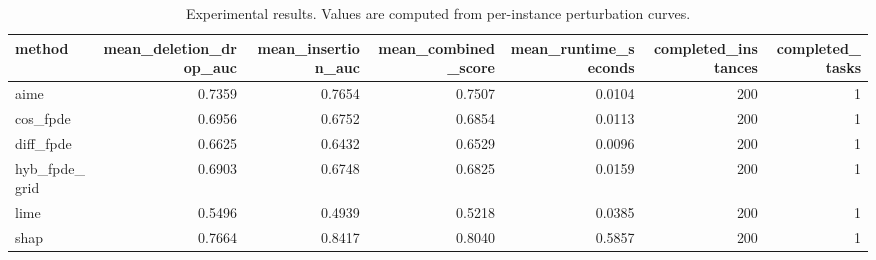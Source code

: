 \begin{table}[t]
\caption{Experimental results. Values are computed from per-instance perturbation curves.}
\label{tab:main_results_computed}
\centering
\begin{tabular}{lrrrrrr}
\toprule
method & mean\_deletion\_drop\_auc & mean\_insertion\_auc & mean\_combined\_score & mean\_runtime\_seconds & completed\_instances & completed\_tasks \\
\midrule
aime & 0.7359 & 0.7654 & 0.7507 & 0.0104 & 200 & 1 \\
cos\_fpde & 0.6956 & 0.6752 & 0.6854 & 0.0113 & 200 & 1 \\
diff\_fpde & 0.6625 & 0.6432 & 0.6529 & 0.0096 & 200 & 1 \\
hyb\_fpde\_grid & 0.6903 & 0.6748 & 0.6825 & 0.0159 & 200 & 1 \\
lime & 0.5496 & 0.4939 & 0.5218 & 0.0385 & 200 & 1 \\
shap & 0.7664 & 0.8417 & 0.8040 & 0.5857 & 200 & 1 \\
\bottomrule
\end{tabular}

\end{table}
